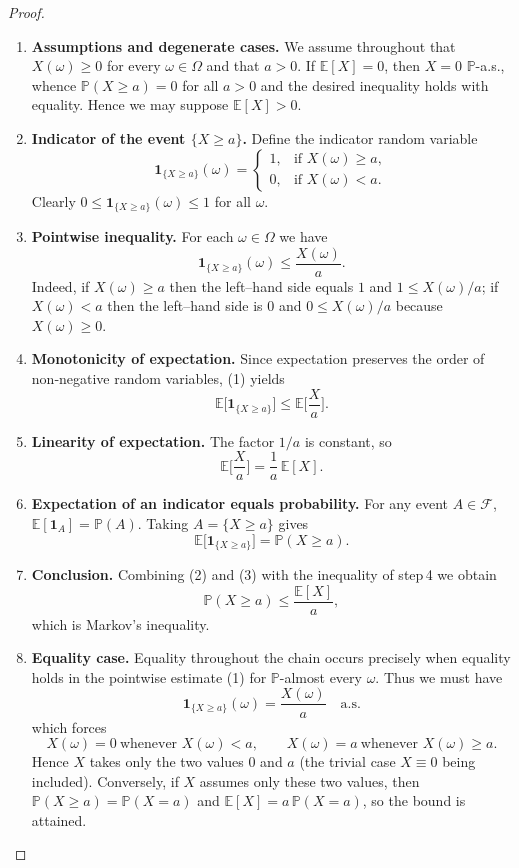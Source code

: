 \begin{proof}
\begin{enumerate}
\item \textbf{Assumptions and degenerate cases.}  
We assume throughout that \(X(\omega)\ge0\) for every \(\omega\in\Omega\) and that \(a>0\).  
If \(\mathbb{E}[X]=0\), then \(X=0\) \(\mathbb{P}\)-a.s., whence \(\mathbb{P}(X\ge a)=0\) for all \(a>0\) and the desired inequality holds with equality.  Hence we may suppose \(\mathbb{E}[X]>0\).

\item \textbf{Indicator of the event \(\{X\ge a\}\).}  
Define the indicator random variable
\[
\mathbf 1_{\{X\ge a\}}(\omega)=
\begin{cases}
1, & \text{if }X(\omega)\ge a,\\[2pt]
0, & \text{if }X(\omega)< a .
\end{cases}
\]
Clearly \(0\le \mathbf 1_{\{X\ge a\}}(\omega)\le1\) for all \(\omega\).

\item \textbf{Pointwise inequality.}  
For each \(\omega\in\Omega\) we have
\[
\mathbf 1_{\{X\ge a\}}(\omega)\le\frac{X(\omega)}{a}. \tag{1}
\]
Indeed, if \(X(\omega)\ge a\) then the left–hand side equals \(1\) and \(1\le X(\omega)/a\);  
if \(X(\omega)<a\) then the left–hand side is \(0\) and \(0\le X(\omega)/a\) because \(X(\omega)\ge0\).

\item \textbf{Monotonicity of expectation.}  
Since expectation preserves the order of non‑negative random variables, (1) yields
\[
\mathbb{E}\!\big[\mathbf 1_{\{X\ge a\}}\big]\le \mathbb{E}\!\Big[\frac{X}{a}\Big].
\]

\item \textbf{Linearity of expectation.}  
The factor \(1/a\) is constant, so
\[
\mathbb{E}\!\Big[\frac{X}{a}\Big]=\frac{1}{a}\,\mathbb{E}[X]. \tag{2}
\]

\item \textbf{Expectation of an indicator equals probability.}  
For any event \(A\in\mathcal{F}\), \(\mathbb{E}[\mathbf 1_{A}]=\mathbb{P}(A)\).  Taking \(A=\{X\ge a\}\) gives
\[
\mathbb{E}\!\big[\mathbf 1_{\{X\ge a\}}\big]=\mathbb{P}(X\ge a). \tag{3}
\]

\item \textbf{Conclusion.}  
Combining (2) and (3) with the inequality of step 4 we obtain
\[
\mathbb{P}(X\ge a)\le\frac{\mathbb{E}[X]}{a},
\]
which is Markov’s inequality.

\item \textbf{Equality case.}  
Equality throughout the chain occurs precisely when equality holds in the pointwise estimate (1) for \(\mathbb{P}\)-almost every \(\omega\).  Thus we must have
\[
\mathbf 1_{\{X\ge a\}}(\omega)=\frac{X(\omega)}{a}\quad\text{a.s.}
\]
which forces
\[
X(\omega)=0\ \text{whenever }X(\omega)<a,\qquad
X(\omega)=a\ \text{whenever }X(\omega)\ge a.
\]
Hence \(X\) takes only the two values \(0\) and \(a\) (the trivial case \(X\equiv0\) being included).  Conversely, if \(X\) assumes only these two values, then \(\mathbb{P}(X\ge a)=\mathbb{P}(X=a)\) and \(\mathbb{E}[X]=a\,\mathbb{P}(X=a)\), so the bound is attained.

\end{enumerate}
\end{proof}